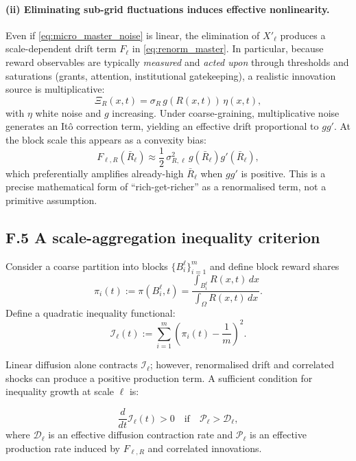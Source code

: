 \documentclass[12pt,a4paper]{article}
\theoremstyle{definition}
\begin{document}
\paragraph{(ii) Eliminating sub-grid fluctuations induces effective nonlinearity.}
Even if \eqref{eq:micro_master_noise} is linear, the elimination of $X'_\ell$ produces a scale-dependent
drift term $F_\ell$ in \eqref{eq:renorm_master}.  In particular, because reward observables are typically
\emph{measured} and \emph{acted upon} through thresholds and saturations (grants, attention, institutional gatekeeping),
a realistic innovation source is multiplicative:
\begin{equation}
  \Xi_R(x,t) = \sigma_R\,g(R(x,t))\,\eta(x,t),
  \label{eq:multiplicative_noise}
\end{equation}
with $\eta$ white noise and $g$ increasing.  Under coarse-graining, multiplicative noise generates an It\^o
correction term, yielding an effective drift proportional to $g g'$.
At the block scale this appears as a convexity bias:
\begin{equation}
  F_{\ell,R}(\bar{R}_\ell) \approx \frac{1}{2}\,\sigma_{R,\ell}^2\,g(\bar{R}_\ell)g'(\bar{R}_\ell),
  \label{eq:ito_drift}
\end{equation}
which preferentially amplifies already-high $\bar{R}_\ell$ when $g g'$ is positive.  This is a precise
mathematical form of ``rich-get-richer'' as a renormalised term, not a primitive assumption.

\subsection*{F.5 A scale-aggregation inequality criterion}

Consider a coarse partition into blocks $\{B_i^\ell\}_{i=1}^m$ and define block reward shares
\[
\pi_i(t) := \pi(B_i^\ell,t) = \frac{\int_{B_i^\ell} R(x,t)\,dx}{\int_\Omega R(x,t)\,dx}.
\]
Define a quadratic inequality functional:
\begin{equation}
  \mathcal{I}_\ell(t) := \sum_{i=1}^m \left(\pi_i(t) - \frac{1}{m}\right)^2.
  \label{eq:ineq_functional}
\end{equation}

Linear diffusion alone contracts $\mathcal{I}_\ell$; however, renormalised drift and correlated shocks can
produce a positive production term.  A sufficient condition for inequality growth at scale $\ell$ is:

\begin{equation}
  \frac{d}{dt}\mathcal{I}_\ell(t) > 0
  \quad \text{if} \quad
  \mathcal{P}_\ell > \mathcal{D}_\ell,
  \label{eq:ineq_growth_condition}
\end{equation}
where $\mathcal{D}_\ell$ is an effective diffusion contraction rate and $\mathcal{P}_\ell$ is an effective
production rate induced by $F_{\ell,R}$ and correlated innovations.
\end{document}
